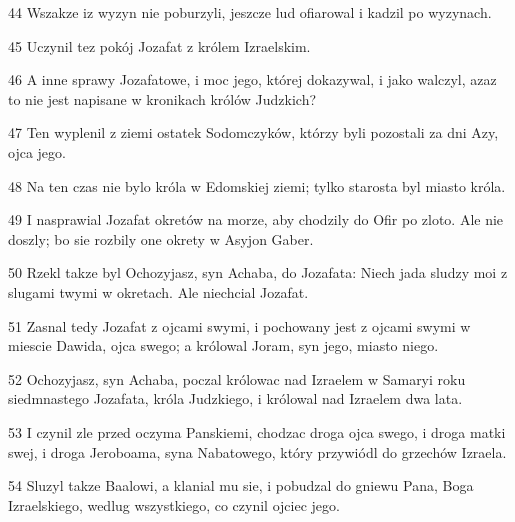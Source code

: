 \par 44 Wszakze iz wyzyn nie poburzyli, jeszcze lud ofiarowal i kadzil po wyzynach.
\par 45 Uczynil tez pokój Jozafat z królem Izraelskim.
\par 46 A inne sprawy Jozafatowe, i moc jego, której dokazywal, i jako walczyl, azaz to nie jest napisane w kronikach królów Judzkich?
\par 47 Ten wyplenil z ziemi ostatek Sodomczyków, którzy byli pozostali za dni Azy, ojca jego.
\par 48 Na ten czas nie bylo króla w Edomskiej ziemi; tylko starosta byl miasto króla.
\par 49 I nasprawial Jozafat okretów na morze, aby chodzily do Ofir po zloto. Ale nie doszly; bo sie rozbily one okrety w Asyjon Gaber.
\par 50 Rzekl takze byl Ochozyjasz, syn Achaba, do Jozafata: Niech jada sludzy moi z slugami twymi w okretach. Ale niechcial Jozafat.
\par 51 Zasnal tedy Jozafat z ojcami swymi, i pochowany jest z ojcami swymi w miescie Dawida, ojca swego; a królowal Joram, syn jego, miasto niego.
\par 52 Ochozyjasz, syn Achaba, poczal królowac nad Izraelem w Samaryi roku siedmnastego Jozafata, króla Judzkiego, i królowal nad Izraelem dwa lata.
\par 53 I czynil zle przed oczyma Panskiemi, chodzac droga ojca swego, i droga matki swej, i droga Jeroboama, syna Nabatowego, który przywiódl do grzechów Izraela.
\par 54 Sluzyl takze Baalowi, a klanial mu sie, i pobudzal do gniewu Pana, Boga Izraelskiego, wedlug wszystkiego, co czynil ojciec jego.


